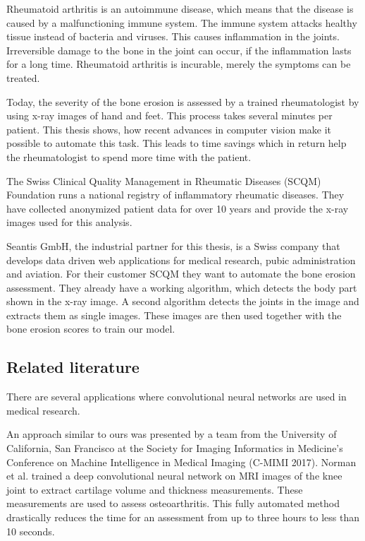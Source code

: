 \documentclass[12pt]{article}
\begin{document}
Rheumatoid arthritis is an autoimmune disease, which means that the disease is caused by a malfunctioning immune system. The immune system attacks healthy tissue instead of bacteria and viruses. This causes inflammation in the joints. Irreversible damage to the bone in the joint can occur, if the inflammation lasts for a long time. \cite{rheuma} Rheumatoid arthritis is incurable, merely the symptoms can be treated.

Today, the severity of the bone erosion is assessed by a trained rheumatologist by using x-ray images of hand and feet. This process takes several minutes per patient. This thesis shows, how recent advances in computer vision make it possible to automate this task. This leads to time savings which in return help the rheumatologist to spend more time with the patient.

The Swiss Clinical Quality Management in Rheumatic Diseases (SCQM) Foundation runs a national registry of inflammatory rheumatic diseases. \cite{scqm_about} They have collected anonymized patient data for over 10 years and provide the x-ray images used for this analysis.

Seantis GmbH, the industrial partner for this thesis, is a Swiss company that develops data driven web applications for medical research, pubic administration and aviation. \cite{seantis_about} For their customer SCQM they want to automate the bone erosion assessment. They already have a working algorithm, which detects the body part shown in the x-ray image. A second algorithm detects the joints in the image and extracts them as single images. These images are then used together with the bone erosion scores to train our model.


\subsection{Related literature}


There are several applications where convolutional neural networks are used in medical research.

An approach similar to ours was presented by a team from the University of California, San Francisco at the Society for Imaging Informatics in Medicine's Conference on Machine Intelligence in Medical Imaging (C-MIMI 2017)\cite{auntminnie}. Norman et al. \cite{norman} trained a deep convolutional neural network on MRI images of the knee joint to extract cartilage volume and thickness measurements. These measurements are used to assess osteoarthritis. This fully automated method drastically reduces the time for an assessment from up to three hours to less than 10 seconds.
\end{document}
